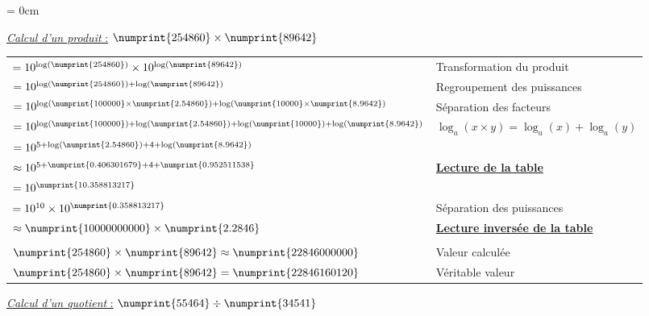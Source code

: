 \documentclass[a4paper, twoside]{article}
\begin{document}
	{\parindent = 0cm

	\underline{\textit{Calcul d'un produit} :} $\numprint{254860} \times \numprint{89642}$
	\vspace{0.2cm}

	\begin{large}
	\begin{tabular}{l|l}

	$= 10 ^{ \log ( \numprint{254860} ) } \times 10 ^ { \log ( \numprint{89642} ) }$ & \small Transformation du produit \\
	$= 10 ^{ \log ( \numprint{254860} ) + \log ( \numprint{89642} ) }$ & \small Regroupement des puissances\\
	$= 10 ^{ \log ( \numprint{100000} \times \numprint{2.54860}) + \log (\numprint{10000} \times \numprint{8.9642})}$ & \small Séparation des facteurs\\
	$= 10 ^{ \log(\numprint{100000}) + \log ( \numprint{2.54860} ) + \log(\numprint{10000}) + \log (\numprint{8.9642}) }$ & \small $ \log_a ( x \times y ) = \log_a (x) + \log_a (y) $\\
	$= 10 ^{ 5 + \log ( \numprint{2.54860} ) + 4 + \log ( \numprint{8.9642} ) }$ & \\
	$\approx 10 ^{ 5 + \numprint{0.406301679} + 4 + \numprint{0.952511538} }$ & \small \underline{\textbf{Lecture de la table}}\\
	$= 10 ^{ \numprint{10.358813217} }$ & \\
	$= 10 ^{ 10 } \times 10^{ \numprint{0.358813217} }$ & \small Séparation des puissances \\
	$\approx \numprint{10000000000} \times \numprint{2.2846}$ & \small \underline{\textbf{Lecture inversée de la table}} \\
	\\
	$\numprint{254860} \times \numprint{89642} \approx \numprint{22846000000} $ & \small Valeur calculée\\
	$\numprint{254860} \times \numprint{89642} = \numprint{22846160120} $ & \small Véritable valeur \\

	\end{tabular}
	\end{large}

	\vfill

	\underline{\textit{Calcul d'un quotient} :} $\numprint{55464} \div \numprint{34541}$
	\vspace{0.2cm}

	\begin{large}
	\begin{tabular}{l|l}


\end{tabular}
\end{large}}
\end{document}
